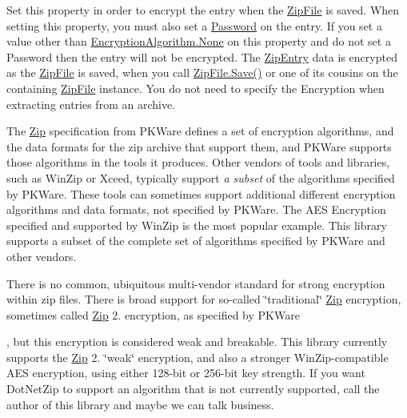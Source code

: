 Set this property in order to encrypt the entry when the {\ttfamily \mbox{\hyperlink{class_super_tiled2_unity_1_1_ionic_1_1_zip_1_1_zip_file}{Zip\+File}}} is saved. When setting this property, you must also set a \mbox{\hyperlink{class_super_tiled2_unity_1_1_ionic_1_1_zip_1_1_zip_entry_a4e1ce23f98c2e3a60a2d47a25a243a82}{Password}} on the entry. If you set a value other than \mbox{\hyperlink{namespace_super_tiled2_unity_1_1_ionic_1_1_zip_aa3f4e8aa12ef827ac72177a49b4e28e6a6adf97f83acf6453d4a6a4b1070f3754}{Encryption\+Algorithm.\+None}} on this property and do not set a {\ttfamily Password} then the entry will not be encrypted. The {\ttfamily \mbox{\hyperlink{class_super_tiled2_unity_1_1_ionic_1_1_zip_1_1_zip_entry}{Zip\+Entry}}} data is encrypted as the {\ttfamily \mbox{\hyperlink{class_super_tiled2_unity_1_1_ionic_1_1_zip_1_1_zip_file}{Zip\+File}}} is saved, when you call \mbox{\hyperlink{class_super_tiled2_unity_1_1_ionic_1_1_zip_1_1_zip_file_aff8f1b3d07b66481e2629b04017a056f}{Zip\+File.\+Save()}} or one of its cousins on the containing {\ttfamily \mbox{\hyperlink{class_super_tiled2_unity_1_1_ionic_1_1_zip_1_1_zip_file}{Zip\+File}}} instance. You do not need to specify the {\ttfamily Encryption} when extracting entries from an archive. 

The \mbox{\hyperlink{namespace_super_tiled2_unity_1_1_ionic_1_1_zip}{Zip}} specification from P\+K\+Ware defines a set of encryption algorithms, and the data formats for the zip archive that support them, and P\+K\+Ware supports those algorithms in the tools it produces. Other vendors of tools and libraries, such as Win\+Zip or Xceed, typically support {\itshape a subset} of the algorithms specified by P\+K\+Ware. These tools can sometimes support additional different encryption algorithms and data formats, not specified by P\+K\+Ware. The A\+ES Encryption specified and supported by Win\+Zip is the most popular example. This library supports a subset of the complete set of algorithms specified by P\+K\+Ware and other vendors. 

There is no common, ubiquitous multi-\/vendor standard for strong encryption within zip files. There is broad support for so-\/called \char`\"{}traditional\char`\"{} \mbox{\hyperlink{namespace_super_tiled2_unity_1_1_ionic_1_1_zip}{Zip}} encryption, sometimes called \mbox{\hyperlink{namespace_super_tiled2_unity_1_1_ionic_1_1_zip}{Zip}} 2. encryption, as specified by P\+K\+Ware

, but this encryption is considered weak and breakable. This library currently supports the \mbox{\hyperlink{namespace_super_tiled2_unity_1_1_ionic_1_1_zip}{Zip}} 2. \char`\"{}weak\char`\"{} encryption, and also a stronger Win\+Zip-\/compatible A\+ES encryption, using either 128-\/bit or 256-\/bit key strength. If you want Dot\+Net\+Zip to support an algorithm that is not currently supported, call the author of this library and maybe we can talk business. 

